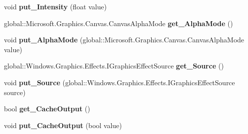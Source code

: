 \begin{DoxyCompactItemize}
\mbox{\label{class_microsoft_1_1_graphics_1_1_canvas_1_1_effects_1_1_sepia_effect_a31889c7859564211fe6944237497aa2d}} 
void {\bfseries put\+\_\+\+Intensity} (float value)
\item 
\mbox{\label{class_microsoft_1_1_graphics_1_1_canvas_1_1_effects_1_1_sepia_effect_ac68e49d7dca255583a419f008aae3de1}} 
global\+::\+Microsoft.\+Graphics.\+Canvas.\+Canvas\+Alpha\+Mode {\bfseries get\+\_\+\+Alpha\+Mode} ()
\item 
\mbox{\label{class_microsoft_1_1_graphics_1_1_canvas_1_1_effects_1_1_sepia_effect_a754dd727263b3e8cdf81de68d07ff1f9}} 
void {\bfseries put\+\_\+\+Alpha\+Mode} (global\+::\+Microsoft.\+Graphics.\+Canvas.\+Canvas\+Alpha\+Mode value)
\item 
\mbox{\label{class_microsoft_1_1_graphics_1_1_canvas_1_1_effects_1_1_sepia_effect_ae31d49568b53d15b07d27ddd36ab1436}} 
global\+::\+Windows.\+Graphics.\+Effects.\+I\+Graphics\+Effect\+Source {\bfseries get\+\_\+\+Source} ()
\item 
\mbox{\label{class_microsoft_1_1_graphics_1_1_canvas_1_1_effects_1_1_sepia_effect_a4ac2ac241338b189e8e7deaf3bccc8ba}} 
void {\bfseries put\+\_\+\+Source} (global\+::\+Windows.\+Graphics.\+Effects.\+I\+Graphics\+Effect\+Source source)
\item 
\mbox{\label{class_microsoft_1_1_graphics_1_1_canvas_1_1_effects_1_1_sepia_effect_af7c18e109fe745228141b8e8209c29e1}} 
bool {\bfseries get\+\_\+\+Cache\+Output} ()
\item 
\mbox{\label{class_microsoft_1_1_graphics_1_1_canvas_1_1_effects_1_1_sepia_effect_ad970b5b7f1dd4ac8b3cb7d43f0ac874f}} 
void {\bfseries put\+\_\+\+Cache\+Output} (bool value)
\item 
\mbox{\label{class_microsoft_1_1_graphics_1_1_canvas_1_1_effects_1_1_sepia_effect_a3272bf412ffdcd507bb1f3c12712ff42}} 

\end{DoxyCompactItemize}
